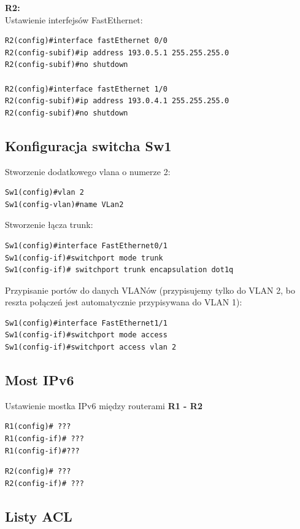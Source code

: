 \documentclass[11pt,a4paper]{article}
\begin{document}
\noindent
{\bf R2:}\\
Ustawienie interfejsów FastEthernet:
\begin{lstlisting}
R2(config)#interface fastEthernet 0/0
R2(config-subif)#ip address 193.0.5.1 255.255.255.0
R2(config-subif)#no shutdown

R2(config)#interface fastEthernet 1/0
R2(config-subif)#ip address 193.0.4.1 255.255.255.0
R2(config-subif)#no shutdown
\end{lstlisting}

\subsection{Konfiguracja switcha Sw1}
Stworzenie dodatkowego vlana o numerze 2:
\begin{lstlisting}
Sw1(config)#vlan 2
Sw1(config-vlan)#name VLan2
\end{lstlisting}
Stworzenie łącza trunk:
\begin{lstlisting}
Sw1(config)#interface FastEthernet0/1
Sw1(config-if)#switchport mode trunk
Sw1(config-if)# switchport trunk encapsulation dot1q
\end{lstlisting}
Przypisanie portów do danych VLANów (przypisujemy tylko do VLAN 2, bo reszta połączeń jest automatycznie przypisywana do VLAN 1):
\begin{lstlisting}
Sw1(config)#interface FastEthernet1/1
Sw1(config-if)#switchport mode access
Sw1(config-if)#switchport access vlan 2
\end{lstlisting}
\subsection{Most IPv6}

\noindent
Ustawienie mostka IPv6 między routerami {\bf R1 - R2}
\begin{lstlisting}
R1(config)# ???
R1(config-if)# ???
R1(config-if)#???
\end{lstlisting}

\begin{lstlisting}
R2(config)# ???
R2(config-if)# ???
\end{lstlisting}

\subsection{Listy ACL}
\end{document}
